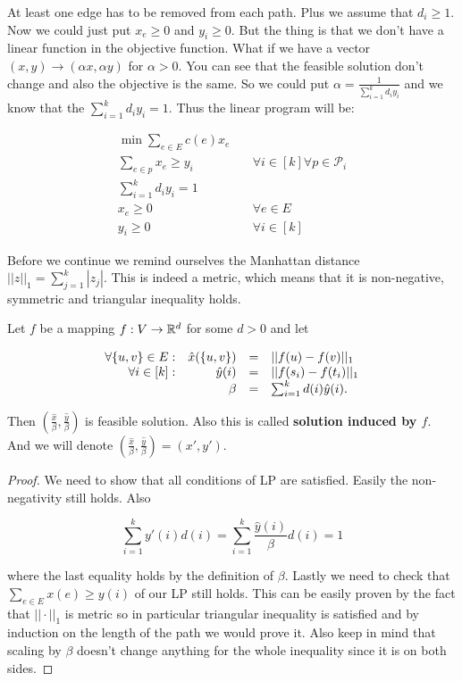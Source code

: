 At least one edge has to be removed from each path. Plus we assume that $d_{i} \geq 1$. Now we could just put $x_{e} \geq 0$ and $y_{i} \geq 0$. But the thing is that we don't have a linear function in the objective function. What if we have a vector $(x,y) \to (\alpha x, \alpha y)$ for $\alpha > 0$. You can see that the feasible solution don't change and also the objective is the same. So we could put $\alpha = \frac{1}{\sum_{i = 1}^{k} d_{i}y_{i}}$ and we know that the $\sum_{i = 1}^{k} d_{i}y_{i} = 1$. Thus the linear program will be:

$$
\begin{aligned}
	\min \sum_{e \in E} c(e) x_{e} \\
	\sum_{e \in p} x_{e} \geq y_{i} &\quad \forall i \in [k] \forall p \in \mathcal{P}_{i}\\
	\sum_{i = 1}^{k} d_{i}y_{i} = 1 \\
	x_{e} \geq 0 &\quad \forall e \in E\\
	 y_{i} \geq 0 &\quad \forall i \in [k]
\end{aligned}
$$

Before we continue we remind ourselves the Manhattan distance $||z||_{1} = \sum_{j=1}^{k} |z_{j}|$. This is indeed a metric, which means that it is non-negative, symmetric and triangular inequality holds.

\begin{lemma}
	Let $f$ be a mapping $f: V \to \mathbb{R}^{d}$ for some $d > 0$ and let
	
	$$
	\begin{array}{r r c l}
		\forall \{u,v\} \in E: & \hat{x}(\{u,v\}) & = & ||f(u) - f(v)||_{1} \\
		\forall i \in [k]: & \hat{y}(i) & = & ||f(s_{i}) - f(t_{i})||_{1} \\
		& \beta & = & \sum_{i = 1}^{k} d(i) \hat{y}(i).
	\end{array}
	$$
	
	Then $\left(\frac{\hat{x}}{\beta}, \frac{\hat{y}}{\beta}\right)$ is feasible solution. Also this is called \textbf{solution induced by $f$}. And we will denote $\left(\frac{\hat{x}}{\beta}, \frac{\hat{y}}{\beta}\right) = \left(x', y'\right)$.
\end{lemma}

\begin{proof}
	We need to show that all conditions of LP are satisfied. Easily the non-negativity still holds. Also
	
	$$
	\sum_{i=1}^{k} y'(i) d(i) = \sum_{i=1}^{k} \frac{\hat{y}(i)}{\beta}d(i) = 1
	$$
	
	where the last equality holds by the definition of $\beta$. Lastly we need to check that $\sum_{e \in E} x(e) \geq y(i)$ of our LP still holds. This can be easily proven by the fact that $||\cdot||_{1}$ is metric so in particular triangular inequality is satisfied and by induction on the length of the path we would prove it. Also keep in mind that scaling by $\beta$ doesn't change anything for the whole inequality since it is on both sides.
\end{proof}

